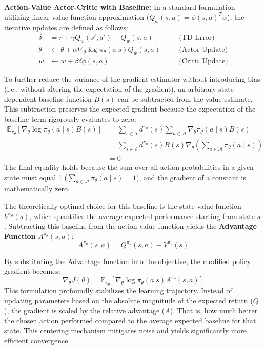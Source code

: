 \documentclass[a4paper]{scrartcl}
\begin{document}
\begin{itemize}
    \textbf{Action-Value Actor-Critic with Baseline:}
    In a standard formulation utilizing linear value function approximation ($Q_w(s,a) = \phi(s,a)^T w$), the iterative updates are defined as follows:
    \begin{align}
    \delta &= r + \gamma Q_w(s', a') - Q_w(s, a) && \quad \text{(TD Error)} \\
    \theta &\leftarrow \theta + \alpha \nabla_\theta \log \pi_\theta(a|s) Q_w(s, a) && \quad \text{(Actor Update)} \\
    w &\leftarrow w + \beta \delta \phi(s, a) && \quad \text{(Critic Update)}
    \end{align}
    
    To further reduce the variance of the gradient estimator without introducing bias (i.e., without altering the expectation of the gradient), an arbitrary state-dependent baseline function $B(s)$ can be subtracted from the value estimate. This subtraction preserves the expected gradient because the expectation of the baseline term rigorously evaluates to zero:
    \begin{equation}
    \begin{aligned}
    \mathbb{E}_{\pi_\theta} [\nabla_\theta \log \pi_\theta(a \mid s) B(s)] &= \sum_{s \in \mathcal{S}} d^{\pi_\theta}(s) \sum_{a \in \mathcal{A}} \nabla_\theta \pi_\theta(a \mid s) B(s) \\
    &= \sum_{s \in \mathcal{S}} d^{\pi_\theta}(s) B(s) \nabla_\theta \left( \sum_{a \in \mathcal{A}} \pi_\theta(a \mid s) \right) \\
    &= 0
    \end{aligned}
    \end{equation}
    The final equality holds because the sum over all action probabilities in a given state must equal 1 ($\sum_{a \in \mathcal{A}} \pi_\theta(a \mid s) = 1$), and the gradient of a constant is mathematically zero. 
    
    The theoretically optimal choice for this baseline is the state-value function $V^{\pi_\theta}(s)$, which quantifies the average expected performance starting from state $s$. Subtracting this baseline from the action-value function yields the \textbf{Advantage Function} $A^{\pi_\theta}(s,a)$:
    \begin{equation}
    A^{\pi_\theta}(s,a) = Q^{\pi_\theta}(s,a) - V^{\pi_\theta}(s)
    \end{equation}
    
    By substituting the Advantage function into the objective, the modified policy gradient becomes:
    \begin{equation}
    \nabla_\theta J(\theta) = \mathbb{E}_{\pi_\theta}[\nabla_\theta \log \pi_\theta(a|s) A^{\pi_\theta}(s,a)]
    \end{equation}
    This formulation profoundly stabilizes the learning trajectory. Instead of updating parameters based on the absolute magnitude of the expected return ($Q$), the gradient is scaled by the relative advantage ($A$). That is, how much better the chosen action performed compared to the average expected baseline for that state. This centering mechanism mitigates noise and yields significantly more efficient convergence.
\end{itemize}
\end{document}
